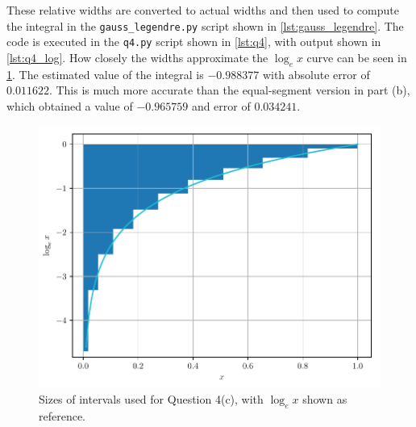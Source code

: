 \documentclass[a4paper,titlepage]{article}
\newcommand{\code}[1]{\texttt{#1}}
\begin{document}
	These relative widths are converted to actual widths and then used to compute the integral in the \code{gauss\_legendre.py} script shown in \cref{lst:gauss_legendre}. The code is executed in the \code{q4.py} script shown in \cref{lst:q4}, with output shown in \cref{lst:q4_log}.	How closely the widths approximate the $\log_e x$ curve can be seen in \cref{fig:q4c}. The estimated value of the integral is $-0.988377$ with absolute error of $0.011622$. This is much more accurate than the equal-segment version in part (b), which obtained a value of $-0.965759$ and error of $0.034241$.
	
	\begin{figure}[!htb]
		\centering
		\includegraphics[width=\columnwidth]{plots/q4c.pdf}
		\caption
		{Sizes of intervals used for Question 4(c), with $\log_e x$ shown as reference.}
		\label{fig:q4c}
	\end{figure}

	\onecolumn
	
\end{document}
